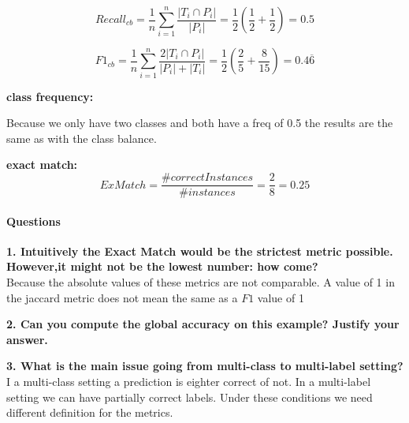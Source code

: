 \documentclass[10pt]{article}
\begin{document}
$$Recall_{cb} =\frac{1}{n}\sum_{i=1}^{n} \frac{|{T_i}\cap{P_i}|}{|P_i|} = \frac{1}{2} \left(\frac{1}{2} + \frac{1}{2}\right) = 0.5$$
 
$$F1_{cb} =\frac{1}{n}\sum_{i=1}^{n} \frac{2|{T_i}\cap{P_i}|}{|P_i|+|T_i|} = \frac{1}{2}\left(\frac{2}{5}+\frac{8}{15}\right) = 0.4\overline{6}$$

\textbf{class frequency:}

Because we only have two classes and both have a freq of 0.5 the results are the same as with the class balance.

\textbf{exact match:}
$$ ExMatch = \frac{\#correct Instances}{\# instances} = \frac{2}{8} = 0.25 $$

\paragraph{Questions\\}

\textbf{1. Intuitively the Exact Match would be the strictest metric possible. However,it might not be the lowest number: how come?\\}
Because the absolute values of these metrics are not comparable. A value of 1 in the jaccard metric does not mean the same as a $F1$ value of 1

\textbf{2. Can you compute the global accuracy on this example? Justify your answer.\\}

\textbf{3. What is the main issue going from multi-class to multi-label setting?\\}
I a multi-class setting a prediction is eighter correct of not. In a multi-label setting we can have partially correct labels. Under these conditions we need different definition for the metrics.

   
\end{document}
